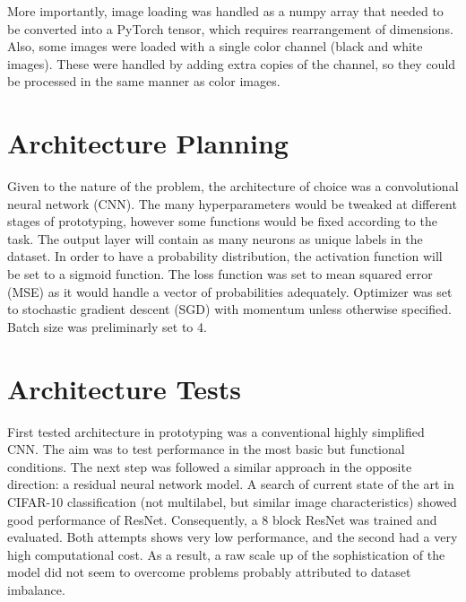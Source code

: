 \documentclass{article}
\begin{document}
More importantly, image loading was handled as a numpy array that needed to be converted into a PyTorch tensor, which requires rearrangement of dimensions.
Also, some images were loaded with a single color channel (black and white images).
These were handled by adding extra copies of the channel, so they could be processed in the same manner as color images.


\section{Architecture Planning}
Given to the nature of the problem, the architecture of choice was a convolutional neural network (CNN).
The many hyperparameters would be tweaked at different stages of prototyping, however some functions would be fixed according to the task.
The output layer will contain as many neurons as unique labels in the dataset.
In order to have a probability distribution, the activation function will be set to a sigmoid function.
The loss function was set to mean squared error (MSE) as it would handle a vector of probabilities adequately.
Optimizer was set to stochastic gradient descent (SGD) with momentum unless otherwise specified.
Batch size was preliminarly set to 4.

\section{Architecture Tests}
First tested architecture in prototyping was a conventional highly simplified CNN.
The aim was to test performance in the most basic but functional conditions.
The next step was followed a similar approach in the opposite direction: a residual neural network model.
A search of current state of the art in CIFAR-10 classification (not multilabel, but similar image characteristics) showed good performance of ResNet.
Consequently, a 8 block ResNet was trained and evaluated.
Both attempts shows very low performance, and the second had a very high computational cost.
As a result, a raw scale up of the sophistication of the model did not seem to overcome problems probably attributed to dataset imbalance.
\end{document}
